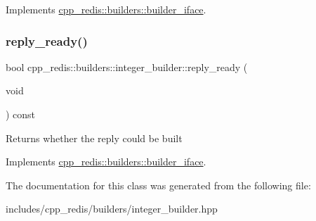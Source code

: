 Implements \hyperlink{classcpp__redis_1_1builders_1_1builder__iface_a9892bbc9c887c31c2742dad4476e2fa6}{cpp\+\_\+redis\+::builders\+::builder\+\_\+iface}.

\mbox{\label{classcpp__redis_1_1builders_1_1integer__builder_a4893dc36d06d75094bb4fe3fbc826966}} 
\subsubsection{\texorpdfstring{reply\+\_\+ready()}{reply\_ready()}}
{\footnotesize\ttfamily bool cpp\+\_\+redis\+::builders\+::integer\+\_\+builder\+::reply\+\_\+ready (\begin{DoxyParamCaption}\item[{void}]{ }\end{DoxyParamCaption}) const\hspace{0.3cm}{\ttfamily [virtual]}}

\begin{DoxyReturn}{Returns}
whether the reply could be built 
\end{DoxyReturn}


Implements \hyperlink{classcpp__redis_1_1builders_1_1builder__iface_a40db9a31d4ea1771777e74146d31e12d}{cpp\+\_\+redis\+::builders\+::builder\+\_\+iface}.



The documentation for this class was generated from the following file\+:\begin{DoxyCompactItemize}
\item 
includes/cpp\+\_\+redis/builders/integer\+\_\+builder.\+hpp\end{DoxyCompactItemize}
